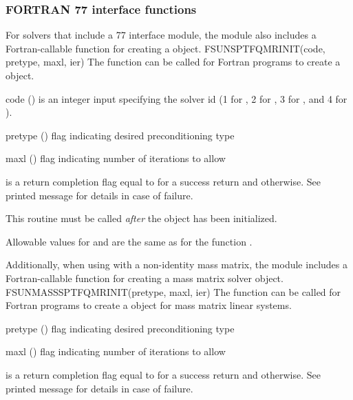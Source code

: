 \subsubsection*{FORTRAN 77 interface functions}
For solvers that include a {\F} 77 interface module, the
{\sunlinsolsptfqmr} module also includes a Fortran-callable function
for creating a  object.
%
%
{
  FSUNSPTFQMRINIT(code, pretype, maxl, ier)
}
{
  The function  can be called for Fortran programs
  to create a {\sunlinsolsptfqmr} object.
}
{
  \begin{args}[pretype]
  \item[code] ()
    is an integer input specifying the solver id (1 for {\cvode}, 2
    for {\ida}, 3 for {\kinsol}, and 4 for {\arkode}).
  \item[pretype] ()
    flag indicating desired preconditioning type
  \item[maxl] ()
    flag indicating number of iterations to allow
  \end{args}
}
{
   is a return completion flag equal to  for a success
  return and  otherwise. See printed message for details in case
  of failure.
}
{
  This routine must be called \emph{after} the {\nvector} object has
  been initialized.

  Allowable values for  and  are the same as for
  the {\CC} function \newline {}.
}
Additionally, when using {\arkode} with a non-identity
mass matrix, the {\sunlinsolsptfqmr} module includes a Fortran-callable
function for creating a  mass matrix solver
object.
%
%
{
  FSUNMASSSPTFQMRINIT(pretype, maxl, ier)
}
{
  The function  can be called for Fortran programs
  to create a {\sunlinsolsptfqmr} object for mass matrix linear systems.
}
{
  \begin{args}[pretype]
  \item[pretype] ()
    flag indicating desired preconditioning type
  \item[maxl] ()
    flag indicating number of iterations to allow
  \end{args}
}
{
   is a  return completion flag equal to  for a success
  return and  otherwise. See printed message for details in case
  of failure.
}
